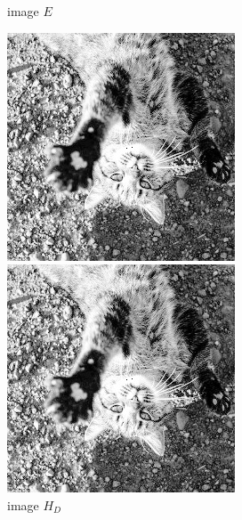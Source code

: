 \documentclass[12pt,a4paper,notitlepage,oneside,amsmath,amssymb]{article}
\begin{document}
\begin{CJK*}{UTF8}{bkai}
\begin{enumerate}[label=(\alph*)]
\begin{figure}[hbt!]
\begin{minipage}{.25\textwidth}
              \caption*{image \(E\)}
            \end{minipage}%
            \begin{minipage}{.25\textwidth}
              \centering
              \includegraphics[width=.95\linewidth]{image_HD}
              \caption*{image \(H_D\)}
            \end{minipage}%
            \begin{minipage}{.25\textwidth}
              \centering
              \includegraphics[width=.95\linewidth]{image_HE}

\end{minipage}
\end{figure}
\end{enumerate}
\end{CJK*}
\end{document}
